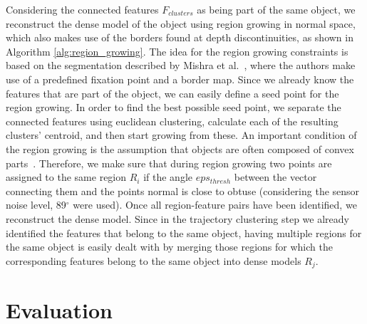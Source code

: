 Considering the connected features $F_{clusters}$ as being part of the same object, we reconstruct 
the dense model of the object using region growing in normal space, which also makes use of the 
borders found at depth discontinuities, as shown in Algorithm \ref{alg:region_growing}. 
The idea for the region growing 
constraints is based on the segmentation described by Mishra et al.~\cite{asICCV2009}, 
where the authors make use of a predefined fixation point and a border map. Since we already 
know the features that are part of the object, we can easily define a seed point for the
region growing. In order to find the best possible seed point, we separate the connected 
features using euclidean clustering, calculate each of the resulting clusters' centroid, and 
then start growing from these. An important condition of the region growing is the 
assumption that objects are often composed of convex parts~\cite{Pogor}.
Therefore, we make sure that during region growing two points are assigned to the same region $R_{i}$
if the angle $eps_{thresh}$ between the vector connecting them and the points normal is close to obtuse
(considering the sensor noise level\cite{kinect_accuracy}, 89$^\circ$ were used).
Once all region-feature pairs have been identified, we reconstruct the dense model.
Since in the trajectory clustering step we already identified the features that belong to the same object,
having multiple regions for the same object is easily dealt with
by merging those regions for which the corresponding features belong to the same object into dense models $R_{j}$.



\section{Evaluation}
\label{sec:evaluation}
